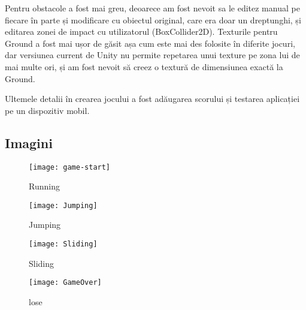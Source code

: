 Pentru obstacole a fost mai greu, deoarece am fost nevoit sa le editez manual pe fiecare în parte și modificare cu obiectul original, care era doar un dreptunghi, și editarea zonei de impact cu utilizatorul (BoxCollider2D). Texturile pentru Ground a fost mai ușor de găsit așa cum este mai des folosite în diferite jocuri, dar versiunea current de Unity nu permite repetarea unui texture pe zona lui de mai multe ori, și am fost nevoit să creez o textură de dimensiunea exactă la Ground.

Ultemele detalii în crearea jocului a fost adăugarea scorului și testarea aplicației pe un dispozitiv mobil.


\subsection{Imagini}
\begin{center}
	\begin{figure}[h]
		\centering
		\texttt{[image: game-start]}\\
		\caption{Running}
		\label{run}
	\end{figure}
	
	\begin{figure}[h]
		\centering
		\texttt{[image: Jumping]}\\
		\caption{Jumping}
		\label{jump}
	\end{figure}
	
	\begin{figure}[h]
		\centering
		\texttt{[image: Sliding]}\\
		\caption{Sliding}
		\label{slide}
	\end{figure}
	
	\begin{figure}[h]
		\centering
		\texttt{[image: GameOver]}\\
		\caption{lose}
		\label{lose}
	\end{figure}
\end{center}

\clearpage
